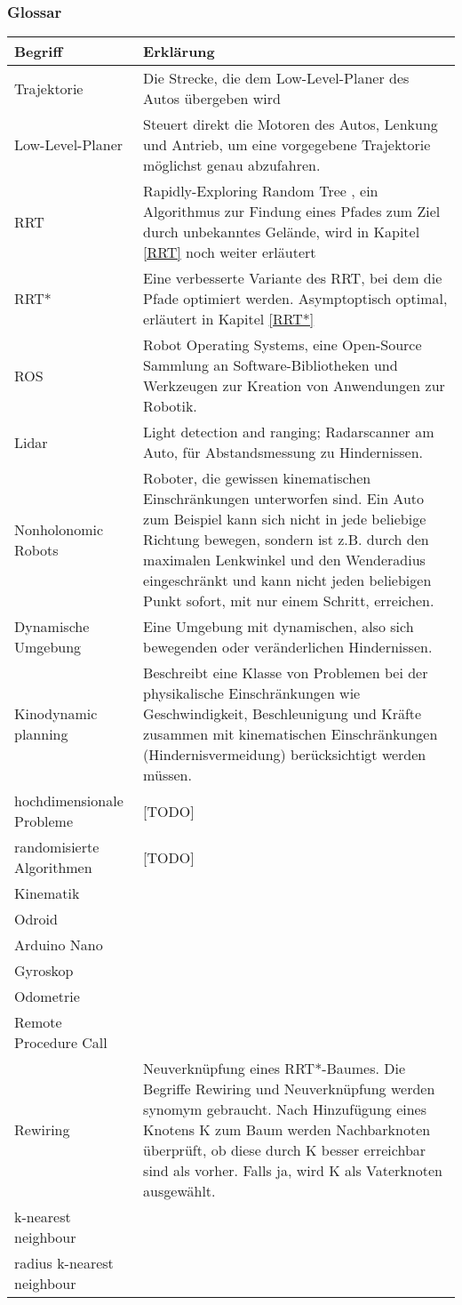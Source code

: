 \subsubsection{Glossar}
\begin{tabularx}{\textwidth}{l|X}
 \textbf{Begriff}  & \textbf{Erklärung}  \\
\hline Trajektorie & Die Strecke, die dem Low-Level-Planer des Autos übergeben wird\\
Low-Level-Planer & Steuert direkt die Motoren des Autos, Lenkung und Antrieb, um eine vorgegebene Trajektorie möglichst genau abzufahren. \\
RRT & Rapidly-Exploring Random Tree \citep{Lav98}, ein Algorithmus zur Findung eines Pfades zum Ziel durch unbekanntes Gelände, wird in Kapitel \ref{RRT} noch weiter erläutert\\
RRT* & Eine verbesserte Variante des RRT, bei dem die Pfade optimiert werden. Asymptoptisch optimal, erläutert in Kapitel \ref{RRT*} \\
ROS & Robot Operating Systems, eine Open-Source Sammlung an Software-Bibliotheken und Werkzeugen zur 	Kreation von Anwendungen zur Robotik. \\
Lidar & Light detection and ranging; Radarscanner am Auto, für Abstandsmessung zu Hindernissen.\\
Nonholonomic Robots & Roboter, die gewissen kinematischen Einschränkungen unterworfen sind. Ein Auto zum Beispiel kann sich nicht in jede beliebige Richtung bewegen, sondern ist z.B. durch den maximalen Lenkwinkel und den Wenderadius eingeschränkt und kann nicht jeden beliebigen Punkt sofort, mit nur einem Schritt, erreichen.  \\
Dynamische Umgebung & Eine Umgebung mit dynamischen, also sich bewegenden oder veränderlichen Hindernissen. \\
Kinodynamic planning & Beschreibt eine Klasse von Problemen bei der physikalische Einschränkungen wie Geschwindigkeit, Beschleunigung und Kräfte zusammen mit kinematischen Einschränkungen (Hindernisvermeidung) berücksichtigt werden müssen. \\
hochdimensionale Probleme & [TODO]\\
randomisierte Algorithmen & [TODO]\\
Kinematik & \\
Odroid & \\
Arduino Nano & \\
Gyroskop & \\
Odometrie & \\
Remote Procedure Call & \\
Rewiring & Neuverknüpfung eines RRT*-Baumes. Die Begriffe Rewiring und Neuverknüpfung werden synomym gebraucht. Nach Hinzufügung eines Knotens K zum Baum werden Nachbarknoten überprüft, ob diese durch K besser erreichbar sind als vorher. Falls ja, wird K als Vaterknoten ausgewählt. \\
k-nearest neighbour & \\
radius k-nearest neighbour & \\

\end{tabularx} 

